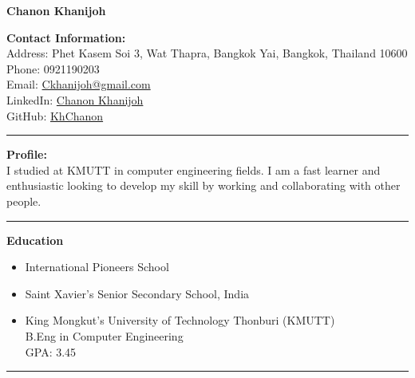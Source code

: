 \documentclass[a4paper,10pt]{article}
\begin{document}
\begin{center}
    \textbf{\Huge Chanon Khanijoh} \\
    \vspace{0.2cm}
\end{center}

\noindent
\textbf{Contact Information:} \\
Address: Phet Kasem Soi 3, Wat Thapra, Bangkok Yai, Bangkok, Thailand 10600 \\
Phone: 0921190203 \\
Email: \href{mailto:Ckhanijoh@gmail.com}{Ckhanijoh@gmail.com} \\
LinkedIn: \href{https://www.linkedin.com/in/chanon-khanijoh-689991252}{Chanon Khanijoh} \\
GitHub: \href{https://github.com/KhChanon}{KhChanon} \\

\hrule
\vspace{0.3cm}

\noindent
\textbf{Profile:} \\
I studied at KMUTT in computer engineering fields. I am a fast learner and enthusiastic looking to develop my skill by working and collaborating with other people.

\vspace{0.3cm}
\hrule
\vspace{0.3cm}

\noindent
\textbf{Education}
\begin{itemize}[leftmargin=0.5cm, noitemsep, topsep=0pt]
    \item International Pioneers School
    \item Saint Xavier's Senior Secondary School, India
    \item King Mongkut’s University of Technology Thonburi (KMUTT) \\ B.Eng in Computer
          Engineering \\ GPA: 3.45
\end{itemize}

\vspace{0.3cm}
\hrule
\vspace{0.3cm}
\end{document}
